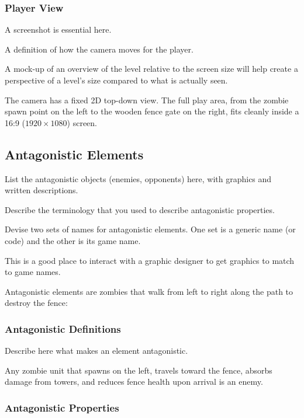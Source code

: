 \subsubsection{Player View}

\begin{guidance}
A screenshot is essential here.

A definition of how the camera moves for the player.

A mock-up of an overview of the level relative to the screen size will help create a perspective of a level’s size compared to what is actually seen.
\end{guidance}
The camera has a fixed 2D top-down view. The full play area, from the zombie spawn point on the left to the wooden fence gate on the right, fits cleanly inside a 16:9 ($1920\times1080$) screen.

\subsection{Antagonistic Elements}

\begin{guidance}
List the antagonistic objects (enemies, opponents) here, with graphics and written descriptions.

Describe the terminology that you used to describe antagonistic properties.

Devise two sets of names for antagonistic elements. One set is a generic name (or code) and the other is its game name.

This is a good place to interact with a graphic designer to get graphics to match to game names.
\end{guidance}
Antagonistic elements are zombies that walk from left to right along the path to destroy the fence:

\subsubsection{Antagonistic Definitions}

\begin{guidance}
Describe here what makes an element antagonistic.
\end{guidance}
Any zombie unit that spawns on the left, travels toward the fence, absorbs damage from towers, and reduces fence health upon arrival is an enemy.

\subsubsection{Antagonistic Properties}

